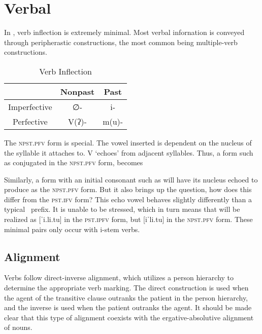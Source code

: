 \chapter{Verbal}


In \langname , verb inflection is extremely minimal. Most verbal infornation is conveyed through peripherastic constructions, the most common being multiple-verb constructions.

\begin{table}[ht]
  \centering
  \begin{tabular}{*{3}{c}}
    \toprule
                 & Nonpast & Past  \\\midrule
    Imperfective & ∅-      & i-    \\
    Perfective   & V(ʔ)-   & m(u)- \\
    \bottomrule
  \end{tabular}
  \caption{Verb Inflection}
  \label{table:verb}
\end{table}

The \textsc{npst.pfv} form is special. The vowel inserted is dependent on the nucleus of the syllable it attaches to. V `echoes' from adjacent syllables. Thus, a form such as  conjugated in the \textsc{npst.pfv} form, becomes 

Similarly, a form with an initial consonant such as  will have its nucleus echoed to produce  as the \textsc{npst.pfv} form. But it also brings up the question, how does this differ from the \textsc{pst.ifv} form? This echo vowel behaves slightly differently than a typical \langname\ prefix. It is unable to be stressed, which in turn means that  will be realized as [ˈi.li.tu] in the \textsc{pst.ipfv} form, but [iˈli.tu] in the \textsc{npst.pfv} form. These minimal pairs only occur with i-stem verbs.

\section{Alignment}

Verbs follow direct-inverse alignment, which utilizes a person hierarchy to determine the appropriate verb marking. The direct construction is used when the agent of the transitive clause outranks the patient in the person hierarchy, and the inverse is used when the patient outranks the agent. It should be made clear that this type of alignment coexists with the ergative-absolutive alignment of nouns.

